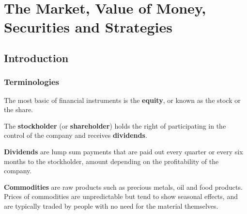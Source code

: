 \section{The Market, Value of Money, Securities and Strategies}
\subsection{Introduction}
\subsubsection{Terminologies}
\begin{definition}[Equity]
  The most basic of financial instruments is the \textbf{equity}, or known as the stock
  or the share.
\end{definition}
The \textbf{stockholder} (or \textbf{shareholder}) holds the right of
participating in the control of the company and receives \textbf{dividends}.
\begin{definition}[Dividend]
  \textbf{Dividends} are lump sum payments that are paid out every quarter or
  every six months to the stockholder, amount depending on the profitability of
  the company.
\end{definition}
\begin{definition}[Commodities]
  \textbf{Commodities} are raw products such as precious metals, oil and food products.
  Prices of commodities are unpredictable but tend to show seasonal effects,
  and are typically traded by people with no need for the material themselves.
\end{definition}

